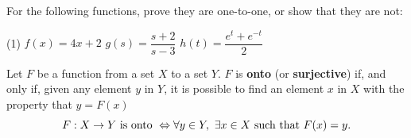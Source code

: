 \documentclass[../mathNotesPreamble]{subfiles}
\begin{document}
  \begin{ex*}
    For the following functions, prove they are one-to-one, or show that they are not:
    \begin{extasks}[after-item-skip=\stretch{1}](1)
      \task $f(x)=4x+2$
      \task $g(s)=\dfrac{s+2}{s-3}$
      \task $h(t)=\dfrac{e^t+e^{-t}}{2}$
    \end{extasks}
  \end{ex*}
  \pagebreak

  \begin{defn*}
    Let $F$ be a function from a set $X$ to a set $Y$. $F$ is \textbf{onto} (or \textbf{surjective}) if, and only if, given any element $y$ in $Y$, it is possible to find an element $x$ in $X$ with the property that $y=F(x)$
      \[F:X\to Y \textnormal{ is onto } \Leftrightarrow \forall y\in Y,\ \exists x\in X \textnormal{ such that } F(x)=y.\]
  \end{defn*}
  \vspace*{0.5\baselineskip}
\end{document}
